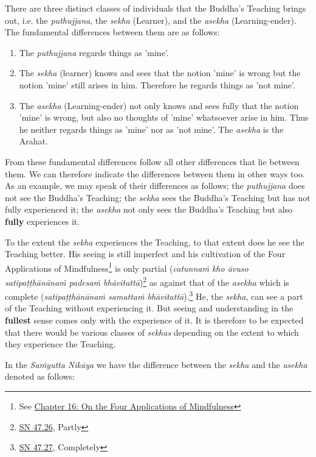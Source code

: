 There are three distinct classes of individuals that the Buddha's Teaching brings out, i.e. the \emph{puthujjana}, the \emph{sekha} (Learner), and the \emph{asekha} (Learning-ender). The fundamental differences between them are as follows:

\begin{enumerate}
\def\labelenumi{\arabic{enumi}.}
\item
  The \emph{puthujjana} regards things as 'mine'.
\item
  The \emph{sekha} (learner) knows and sees that the notion 'mine' is wrong but the notion 'mine' still arises in him. Therefore he regards things as 'not mine'.
\item
  The \emph{asekha} (Learning-ender) not only knows and sees fully that the notion 'mine' is wrong, but also no thoughts of 'mine' whatsoever arise in him. Thus he neither regards things as 'mine' nor as 'not mine'. The \emph{asekha} is the Arahat.
\end{enumerate}

From these fundamental differences follow all other differences that lie between them. We can therefore indicate the differences between them in other ways too. As an example, we may speak of their differences as follows; the \emph{puthujjana} does not see the Buddha's Teaching; the \emph{sekha} sees the Buddha's Teaching but has not fully experienced it; the \emph{asekha} not only sees the Buddha's Teaching but also \textbf{fully} experiences it.

To the extent the \emph{sekha} experiences the Teaching, to that extent does he see the Teaching better. His seeing is still imperfect and his cultivation of the Four Applications of Mindfulness\footnote{See \href{ch-16-satipatthana.xml\#start}{Chapter 16: On the Four Applications of Mindfulness}} is only partial (\emph{catunnaṁ kho āvuso satipaṭṭhānānaṁ padesaṁ bhāvitattā})\footnote{\href{https://suttacentral.net/sn47.26/en/bodhi}{SN 47.26}, Partly} as against that of the \emph{asekha} which is complete (\emph{satipaṭṭhānānaṁ samattaṁ bhāvitattā}).\footnote{\href{https://suttacentral.net/sn47.27/en/bodhi}{SN 47.27}, Completely} He, the \emph{sekha}, can see a part of the Teaching without experiencing it. But seeing and understanding in the \textbf{fullest} sense comes only with the experience of it. It is therefore to be expected that there would be various classes of \emph{sekhas} depending on the extent to which they experience the Teaching.

In the \emph{Saṁyutta Nikāya} we have the difference between the \emph{sekha} and the \emph{asekha} denoted as follows:

